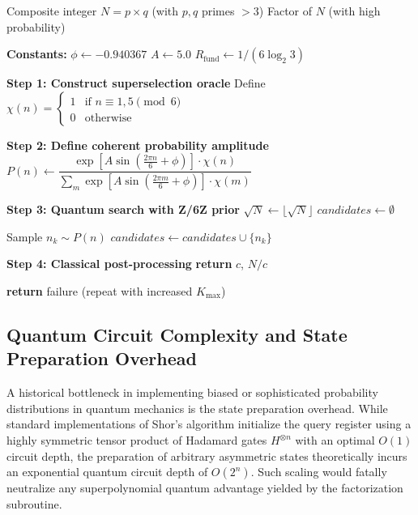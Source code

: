 \documentclass[pdflatex,sn-nature]{sn-jnl}
\theoremstyle{thmstyleone}
\theoremstyle{thmstyletwo}
\theoremstyle{thmstylethree}
\newcommand{\Rfund}{R_{\text{fund}}}
\begin{document}
\begin{algorithm}[h]
\caption{Z/6Z Topological Superselection for Quantum Factoring}
\label{alg:z6z}
\begin{algorithmic}[1]
\Require Composite integer $N = p \times q$ (with $p,q$ primes $>3$)
\Ensure Factor of $N$ (with high probability)

\Statex \textbf{Constants:}
\State $\phi \gets -0.940367$ 
\State $A \gets 5.0$ 
\State $\Rfund \gets 1/(6\log_2 3)$ 

\Statex \textbf{Step 1: Construct superselection oracle}
\State Define $\chi(n) = \begin{cases} 
1 & \text{if } n \equiv 1,5 \pmod{6} \\
0 & \text{otherwise}
\end{cases}$ 

\Statex \textbf{Step 2: Define coherent probability amplitude}
\State $P(n) \gets \dfrac{\exp\left[A\sin\left(\frac{2\pi n}{6} + \phi\right)\right] \cdot \chi(n)}{\sum_{m} \exp\left[A\sin\left(\frac{2\pi m}{6} + \phi\right)\right] \cdot \chi(m)}$

\Statex \textbf{Step 3: Quantum search with Z/6Z prior}
\State $\sqrt{N} \gets \lfloor \sqrt{N} \rfloor$
\State $candidates \gets \emptyset$

 
    \State Sample $n_k \sim P(n)$ 
    \State $candidates \gets candidates \cup \{n_k\}$
\EndFor

\Statex \textbf{Step 4: Classical post-processing}
        \State \textbf{return} $c$, $N/c$
    \EndIf
\EndFor

\State \textbf{return} failure (repeat with increased $K_{\max}$)
\end{algorithmic}
\end{algorithm}

\subsection*{Quantum Circuit Complexity and State Preparation Overhead}

A historical bottleneck in implementing biased or sophisticated probability distributions in quantum mechanics is the state preparation overhead. While standard implementations of Shor's algorithm initialize the query register using a highly symmetric tensor product of Hadamard gates $H^{\otimes n}$ with an optimal $O(1)$ circuit depth, the preparation of arbitrary asymmetric states theoretically incurs an exponential quantum circuit depth of $O(2^n)$. Such scaling would fatally neutralize any superpolynomial quantum advantage yielded by the factorization subroutine.
\end{document}
